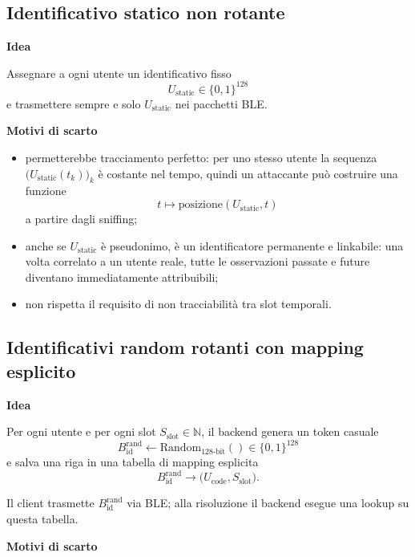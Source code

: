 \documentclass[a4paper,11pt]{article}
\begin{document}
\subsection{Identificativo statico non rotante}

\textbf{Idea}

Assegnare a ogni utente un identificativo fisso
\[
  U_{\text{static}} \in \{0,1\}^{128}
\]
e trasmettere sempre e solo \(U_{\text{static}}\) nei pacchetti BLE.

\textbf{Motivi di scarto}

\begin{itemize}[nosep]
  \item permetterebbe tracciamento perfetto: per uno stesso utente la sequenza
        \(\bigl(U_{\text{static}}(t_k)\bigr)_k\) è costante nel tempo, quindi un attaccante può
        costruire una funzione
        \[
          t \longmapsto \text{posizione}(U_{\text{static}}, t)
        \]
        a partire dagli sniffing;
  \item anche se \(U_{\text{static}}\) è pseudonimo, è un identificatore permanente e linkabile:
        una volta correlato a un utente reale, tutte le osservazioni passate e future diventano
        immediatamente attribuibili;
  \item non rispetta il requisito di non tracciabilità tra slot temporali.
\end{itemize}

\subsection{Identificativi random rotanti con mapping esplicito}

\textbf{Idea}

Per ogni utente e per ogni slot \(S_{\text{slot}} \in \mathbb{N}\), il backend genera un token casuale
\[
  B_{\text{id}}^{\mathrm{rand}} \gets \text{Random}_{128\text{-bit}}() \in \{0,1\}^{128}
\]
e salva una riga in una tabella di mapping esplicita
\[
  B_{\text{id}}^{\mathrm{rand}} \longrightarrow
  \bigl(U_{\text{code}}, S_{\text{slot}}\bigr).
\]

Il client trasmette \(B_{\text{id}}^{\mathrm{rand}}\) via BLE; alla risoluzione il backend esegue una
lookup su questa tabella.

\textbf{Motivi di scarto}
\end{document}
